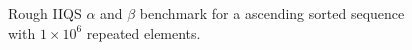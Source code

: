 \begin{figure}


    
    \caption{Rough IIQS $\alpha$ and $\beta$ benchmark for a ascending sorted sequence with $1\times10^6$ repeated elements.}
    \label{FIG:05_ALPHABETA_BENCHMARK_ASC}
\end{figure}



